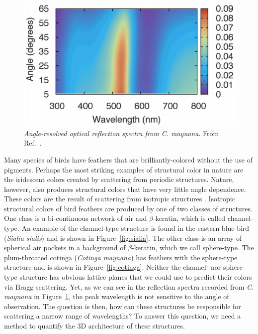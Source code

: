 \begin{figure}[htbp]
\centering
\includegraphics[width=5.0in]{figures/cmaynanaOpticalSpectra.pdf}
\caption{\label{fig:cotingaoptical} \emph{Angle-resolved optical reflection spectra from C. maynana}.
	From Ref.~\cite{Dufresne:2009p6342}.}
\end{figure}

Many species of birds have feathers that are brilliantly-colored without the use of pigments.
Perhaps the most striking examples of structural color in nature are the iridescent colors created by scattering from periodic structures. 
Nature, however, also produces structural colors that have very little angle dependence.
These colors are the result of scattering from isotropic structures \cite{Dufresne:2009p6342, Prum:2009p3119, Prum:1998p1228}. 
Isotropic structural colors of bird feathers are produced by one of two classes of structures.
One class is a bi-continuous network of air and $\beta$-keratin, which is called channel-type. 
An example of the channel-type structure is found in the eastern blue bird (\emph{Sialia sialis}) and is shown in Figure~\ref{fig:sialia}.
The other class is an array of spherical air pockets in a background of $\beta$-keratin, which we call sphere-type.
The plum-throated cotinga (\emph{Cotinga maynana}) has feathers with the sphere-type structure and is shown in Figure~\ref{fig:cotinga}.
Neither the channel- nor sphere-type structure has obvious lattice planes that we could use to predict their colors via Bragg scattering.
Yet, as we can see in the reflection spectra recorded from \emph{C. maynana} in Figure~\ref{fig:cotingaoptical}, the peak wavelength is not sensitive to the angle of observation.
The question is then, how can these structures be responsible for scattering a narrow range of wavelengths?
To answer this question, we need a method to quantify the 3D architecture of these structures.

